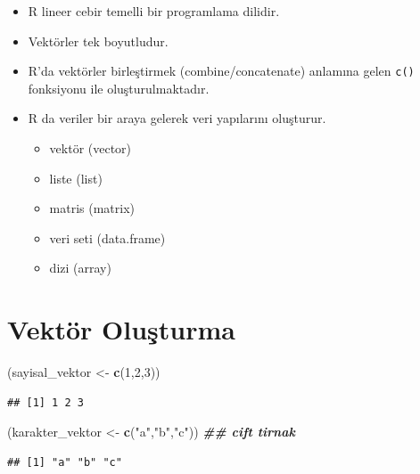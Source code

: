 \documentclass[
  oneside]{book}
\newenvironment{Shaded}{\begin{snugshade}}{\end{snugshade}}
\newcommand{\DecValTok}[1]{\textcolor[rgb]{0.00,0.00,0.81}{#1}}
\newcommand{\DocumentationTok}[1]{\textcolor[rgb]{0.56,0.35,0.01}{\textbf{\textit{#1}}}}
\newcommand{\FunctionTok}[1]{\textcolor[rgb]{0.13,0.29,0.53}{\textbf{#1}}}
\newcommand{\NormalTok}[1]{#1}
\newcommand{\OtherTok}[1]{\textcolor[rgb]{0.56,0.35,0.01}{#1}}
\newcommand{\StringTok}[1]{\textcolor[rgb]{0.31,0.60,0.02}{#1}}
\providecommand{\tightlist}{%
  \setlength{\itemsep}{0pt}\setlength{\parskip}{0pt}}
\begin{document}
\begin{itemize}
\item
  R lineer cebir temelli bir programlama dilidir.
\item
  Vektörler tek boyutludur.
\item
  R'da vektörler birleştirmek (combine/concatenate) anlamına gelen \texttt{c()} fonksiyonu ile oluşturulmaktadır.
\item
  R da veriler bir araya gelerek veri yapılarını oluşturur.

  \begin{itemize}
  \tightlist
  \item
    vektör (vector)
  \item
    liste (list)
  \item
    matris (matrix)
  \item
    veri seti (data.frame)
  \item
    dizi (array)
  \end{itemize}
\end{itemize}

\hypertarget{vektuxf6r-oluux15fturma}{%
\section{Vektör Oluşturma}\label{vektuxf6r-oluux15fturma}}

\begin{Shaded}
\begin{Highlighting}[]
\NormalTok{(sayisal\_vektor }\OtherTok{\textless{}{-}}  \FunctionTok{c}\NormalTok{(}\DecValTok{1}\NormalTok{,}\DecValTok{2}\NormalTok{,}\DecValTok{3}\NormalTok{))}
\end{Highlighting}
\end{Shaded}

\begin{verbatim}
## [1] 1 2 3
\end{verbatim}

\begin{Shaded}
\begin{Highlighting}[]
\NormalTok{(karakter\_vektor }\OtherTok{\textless{}{-}}  \FunctionTok{c}\NormalTok{(}\StringTok{"a"}\NormalTok{,}\StringTok{"b"}\NormalTok{,}\StringTok{"c"}\NormalTok{))  }\DocumentationTok{\#\# cift tirnak}
\end{Highlighting}
\end{Shaded}

\begin{verbatim}
## [1] "a" "b" "c"
\end{verbatim}
\end{document}
